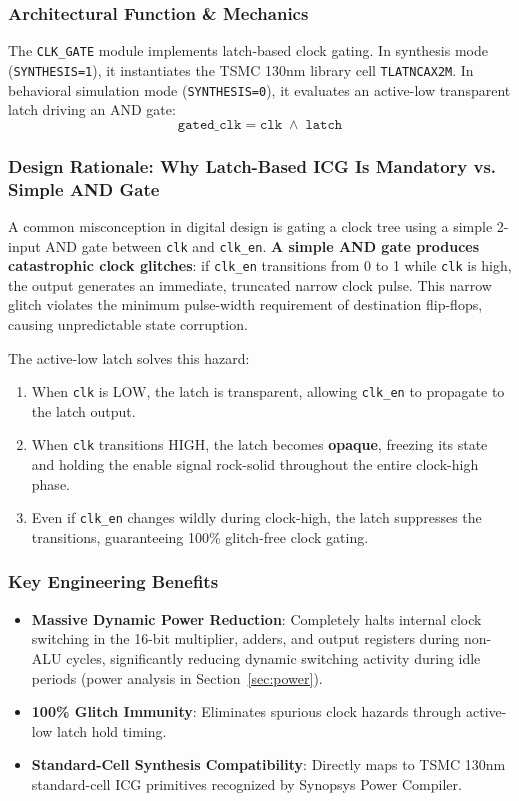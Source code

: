 \documentclass[11pt,a4paper]{article}
\begin{document}
\subsubsection{Architectural Function \& Mechanics}
The \texttt{CLK\_GATE} module implements latch-based clock gating. In synthesis mode (\texttt{SYNTHESIS=1}), it instantiates the TSMC 130nm library cell \texttt{TLATNCAX2M}. In behavioral simulation mode (\texttt{SYNTHESIS=0}), it evaluates an active-low transparent latch driving an AND gate:
\begin{equation}
\texttt{gated\_clk} = \texttt{clk} \;\land\; \texttt{latch}
\end{equation}

\subsubsection{Design Rationale: Why Latch-Based ICG Is Mandatory vs. Simple AND Gate}
A common misconception in digital design is gating a clock tree using a simple 2-input AND gate between \texttt{clk} and \texttt{clk\_en}. \textbf{A simple AND gate produces catastrophic clock glitches}: if \texttt{clk\_en} transitions from 0 to 1 while \texttt{clk} is high, the output generates an immediate, truncated narrow clock pulse. This narrow glitch violates the minimum pulse-width requirement of destination flip-flops, causing unpredictable state corruption.

The active-low latch solves this hazard:
\begin{enumerate}
    \item When \texttt{clk} is LOW, the latch is transparent, allowing \texttt{clk\_en} to propagate to the latch output.
    \item When \texttt{clk} transitions HIGH, the latch becomes \textbf{opaque}, freezing its state and holding the enable signal rock-solid throughout the entire clock-high phase.
    \item Even if \texttt{clk\_en} changes wildly during clock-high, the latch suppresses the transitions, guaranteeing 100\% glitch-free clock gating.
\end{enumerate}

\subsubsection{Key Engineering Benefits}
\begin{itemize}
    \item \textbf{Massive Dynamic Power Reduction}: Completely halts internal clock switching in the 16-bit multiplier, adders, and output registers during non-ALU cycles, significantly reducing dynamic switching activity during idle periods (power analysis in Section~\ref{sec:power}).
    \item \textbf{100\% Glitch Immunity}: Eliminates spurious clock hazards through active-low latch hold timing.
    \item \textbf{Standard-Cell Synthesis Compatibility}: Directly maps to TSMC 130nm standard-cell ICG primitives recognized by Synopsys Power Compiler.
\end{itemize}
\end{document}
